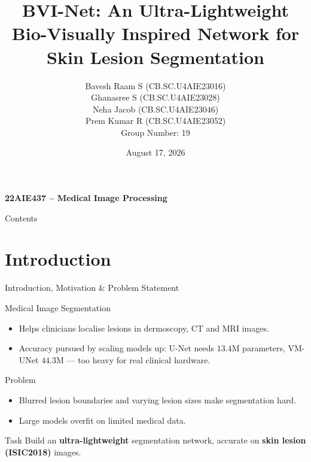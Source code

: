 \documentclass[11pt]{beamer}
\author[Group 19]{Bavesh Raam S (CB.SC.U4AIE23016) \\
Ghanasree S (CB.SC.U4AIE23028) \\
Neha Jacob (CB.SC.U4AIE23046) \\
Prem Kumar R (CB.SC.U4AIE23052) \\[4pt]
Group Number: 19}
\title[22AIE437-Medical Image Processing]{BVI-Net: An Ultra-Lightweight Bio-Visually Inspired Network for Skin Lesion Segmentation}
\institute[]{AMRITA SCHOOL OF ARTIFICIAL INTELLIGENCE \par  AMRITA VISHWA VIDYAPEETHAM
\par}
\date{August 17, 2026}
\begin{document}
\begin{frame}
\begin{center}
\small \textbf{22AIE437 -- Medical Image Processing}
\end{center}
\titlepage
\end{frame}

\begin{frame}{Contents}
\tableofcontents
\end{frame}

\section{Introduction}

\begin{frame}{Introduction, Motivation \& Problem Statement}
    \begin{block}{Medical Image Segmentation}
    \begin{itemize}
        \item Helps clinicians localise lesions in dermoscopy, CT and MRI images.
        \item Accuracy pursued by scaling models up: U-Net needs $13.4$M
              parameters, VM-UNet $44.3$M --- too heavy for real clinical hardware.
    \end{itemize}
    \end{block}

    \begin{block}{Problem}
    \begin{itemize}
        \item Blurred lesion boundaries and varying lesion sizes make
              segmentation hard.
        \item Large models overfit on limited medical data.
    \end{itemize}
    \end{block}

    \begin{block}{Task}
    Build an \textbf{ultra-lightweight} segmentation network, accurate on
    \textbf{skin lesion (ISIC2018)} images.
    \end{block}
\end{frame}
\end{document}
